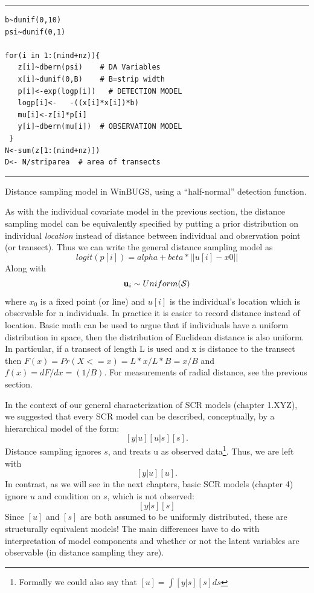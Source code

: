 \begin{panel}[htp]
\centering
\rule[0.15in]{\textwidth}{.03in}
\begin{minipage}{5in}
\begin{verbatim}
b~dunif(0,10)
psi~dunif(0,1)

for(i in 1:(nind+nz)){
   z[i]~dbern(psi)    # DA Variables
   x[i]~dunif(0,B)    # B=strip width
   p[i]<-exp(logp[i])   # DETECTION MODEL
   logp[i]<-   -((x[i]*x[i])*b)
   mu[i]<-z[i]*p[i]
   y[i]~dbern(mu[i])  # OBSERVATION MODEL
 }
N<-sum(z[1:(nind+nz)])
D<- N/striparea  # area of transects
\end{verbatim}
\end{minipage}
\rule[-0.15in]{\textwidth}{.03in}
\caption{Distance sampling model in WinBUGS, using a ``half-normal''
detection function.}
\label{panel.distance}
\end{panel}


As with the individual covariate model in the previous section, the distance sampling model can be equivalently specified by putting a prior distribution on individual {\it location} instead of distance between individual and observation point (or transect).
Thus we can write the general distance sampling model as
\[
 logit(p[i]) = alpha + beta*||u[i] - x0||
\]
Along with
\[
 {\bf u}_{i} \sim Uniform({\cal S})
\]
where $x_{0}$ is a fixed point (or line) and $u[i]$ is the individual's location which is observable for n individuals. In practice it is easier to record distance instead of location.  Basic math can be used to argue that if individuals have a uniform distribution in space, then the distribution of Euclidean distance is also uniform. In particular, if a transect of length L is used and x is distance to the transect then $F(x) = Pr(X<=x) = L*x/L*B = x/B$ and $f(x) = dF/dx = (1/B)$. For measurements of radial distance, see the previous section.

In the context of our general characterization of SCR models (chapter 1.XYZ), we suggested that every SCR model can be described, conceptually, by a hierarchical model of the form:
\[
 [y|u][u|s][s].
\]
Distance sampling ignores $s$, and treats u as observed data\footnote{Formally we could also say that $[u] = \int [y|s][s] ds$}. Thus, we are left with
\[
[y|u][u].
\]
In contrast, as we will see in the next chapters, basic SCR models (chapter 4) ignore $u$ and condition on $s$, which is not observed:
\[
[y|s][s]
\]
Since $[u]$ and $[s]$ are both assumed to be uniformly distributed, these are structurally equivalent  models! The main  differences have to do with interpretation of model components and whether or not the latent variables are observable (in distance sampling they are).


